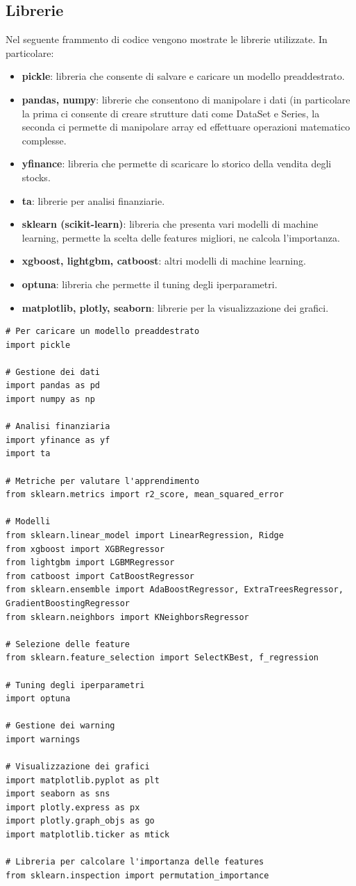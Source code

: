 \documentclass{article}
\begin{document}
\subsection{Librerie}
Nel seguente frammento di codice vengono mostrate le librerie utilizzate. In particolare:
\begin{itemize}
    \item \textbf{pickle}: libreria che consente di salvare e caricare un modello preaddestrato.
    \item \textbf{pandas, numpy}: librerie che consentono di manipolare i dati (in particolare la prima ci consente di creare strutture dati come DataSet e Series, la seconda ci permette di manipolare array ed effettuare operazioni matematico complesse.
    \item \textbf{yfinance}: libreria che permette di scaricare lo storico della vendita degli stocks. 
    \item \textbf{ta}: librerie per analisi finanziarie.
    \item \textbf{sklearn (scikit-learn)}: libreria che presenta vari modelli di machine learning, permette la scelta delle features migliori, ne calcola l'importanza.
    \item \textbf{xgboost, lightgbm, catboost}: altri modelli di machine learning.
    \item \textbf{optuna}: libreria che permette il tuning degli iperparametri.
    \item \textbf{matplotlib, plotly, seaborn}: librerie per la visualizzazione dei grafici.
\end{itemize}
\begin{verbatim}
# Per caricare un modello preaddestrato
import pickle

# Gestione dei dati
import pandas as pd
import numpy as np

# Analisi finanziaria
import yfinance as yf
import ta

# Metriche per valutare l'apprendimento
from sklearn.metrics import r2_score, mean_squared_error

# Modelli
from sklearn.linear_model import LinearRegression, Ridge
from xgboost import XGBRegressor
from lightgbm import LGBMRegressor
from catboost import CatBoostRegressor
from sklearn.ensemble import AdaBoostRegressor, ExtraTreesRegressor, 
GradientBoostingRegressor
from sklearn.neighbors import KNeighborsRegressor

# Selezione delle feature
from sklearn.feature_selection import SelectKBest, f_regression

# Tuning degli iperparametri
import optuna

# Gestione dei warning
import warnings

# Visualizzazione dei grafici
import matplotlib.pyplot as plt
import seaborn as sns
import plotly.express as px
import plotly.graph_objs as go
import matplotlib.ticker as mtick

# Libreria per calcolare l'importanza delle features
from sklearn.inspection import permutation_importance
\end{verbatim}
\newpage
\end{document}
